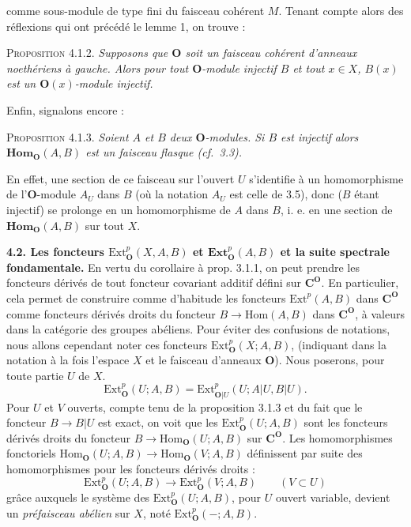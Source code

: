 \clearpage
{}

\noindent comme sous-module de type fini du faisceau cohérent $M$. Tenant compte alors des réflexions qui ont précédé le lemme 1, on trouve :

\textsc{Proposition 4.1.2.} \textit{Supposons que ${\mathbf O}$ soit un faisceau
cohérent d'anneaux noethériens à gauche. Alors pour tout ${\mathbf O}$-module injectif
$B$ et tout $x\in X$, $B(x)$ est un ${\mathbf O}(x)$-module injectif.}

Enfin, signalons encore :

\textsc{Proposition 4.1.3.} \textit{Soient $A$ et $B$ deux
${\mathbf O}$-modules. Si $B$ est injectif alors $\mathbf{Hom}_{\mathbf O}(A,B)$ est un faisceau
flasque \textup{(}cf.\ \textup{3.3)}.}

En effet, une section de ce faisceau sur l'ouvert $U$ s'identifie à un
homomorphisme de l'${\mathbf O}$-module $A_U$ dans $B$ (où la notation $A_U$ est celle
de 3.5), donc ($B$ étant injectif) se prolonge en un homomorphisme de $A$ dans
$B$, i. e. en une section de $\mathbf{Hom}_{\mathbf O}(A,B)$ sur tout $X$.

\textbf{4.2. Les foncteurs $\mathrm{Ext}_{\mathbf O}^p(X,A,B)$ et
$\mathbf{Ext}_{\mathbf O}^p(A,B)$ et la suite spectrale fondamentale.}
En vertu du corollaire à prop. 3.1.1, on peut prendre les foncteurs dérivés de
tout foncteur covariant additif défini sur $\mathbf C^{\mathbf O}$. En particulier, cela permet
de construire comme d'habitude les foncteurs $\mathrm{Ext}^p(A,B)$ dans
$\mathbf C^{\mathbf O}$ comme foncteurs dérivés droits du foncteur
$B\to\mathrm{Hom}(A,B)$ dans $\mathbf C^{\mathbf O}$, à valeurs dans la catégorie des
groupes abéliens. Pour éviter des confusions de notations, nous allons
cependant noter ces foncteurs $\mathrm{Ext}_{\mathbf O}^p(X;A,B)$, (indiquant dans la
notation à la fois l'espace $X$ et le faisceau d'anneaux ${\mathbf O}$). Nous poserons,
pour toute partie $U$ de $X$.
\[
\tag{4.2.1}
\mathrm{Ext}_{\mathbf O}^p(U;A,B)=
\mathrm{Ext}_{{\mathbf O}|U}^p(U;A|U,B|U).
\]
Pour $U$ et $V$ ouverts, compte tenu de la proposition 3.1.3 et du fait que le foncteur
$B\to B|U$ est exact, on voit que les $\mathrm{Ext}_{\mathbf O}^p(U;A,B)$ sont
les foncteurs dérivés droits du foncteur
$B\to\mathrm{Hom}_{\mathbf O}(U;A,B)$ sur $\mathbf C^{\mathbf O}$. Les homomorphismes fonctoriels
$\mathrm{Hom}_{\mathbf O}(U;A,B)\to\mathrm{Hom}_{\mathbf O}(V;A,B)$ définissent par
suite des homomorphismes pour les foncteurs dérivés droits :
\[
\tag{4.2.2}
\mathrm{Ext}_{\mathbf O}^p(U;A,B)\to\mathrm{Ext}_{\mathbf O}^p(V;A,B)
\qquad(V\subset U)
\]
grâce auxquels le système des $\mathrm{Ext}_{\mathbf O}^p(U;A,B)$, pour $U$ ouvert
variable, devient un \textit{préfaisceau abélien} sur $X$, noté
$\mathrm{Ext}_{\mathbf O}^p(-;A,B)$.

